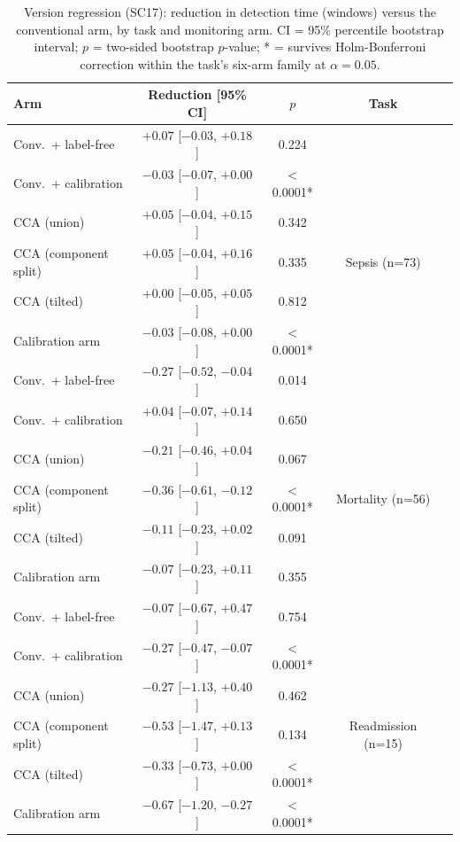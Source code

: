 \documentclass[apajournal,article,submit,oneauthor]{Definitions/mdpi}
\begin{document}
\begin{table}[H]
\caption{Version regression (SC17): reduction in detection time (windows) versus the conventional arm, by task and monitoring arm. CI = 95\% percentile bootstrap interval; $p$ = two-sided bootstrap $p$-value; * = survives Holm-Bonferroni correction within the task's six-arm family at $\alpha=0.05$.\label{tab:sc17}}
\begin{tabularx}{\textwidth}{lCCCC}
\toprule
\textbf{Arm} & \textbf{Reduction [95\% CI]} & \textbf{$p$} & \textbf{Task} & \\
\midrule
Conv.\ + label-free    & $+0.07$ [$-0.03$, $+0.18$]  & 0.224 &   & \\
Conv.\ + calibration   & $-0.03$ [$-0.07$, $+0.00$]  & $<$0.0001* &  & \\
CCA (union)            & $+0.05$ [$-0.04$, $+0.15$]  & 0.342 &  & \\
CCA (component split)  & $+0.05$ [$-0.04$, $+0.16$]  & 0.335 & Sepsis (n=73) & \\
CCA (tilted)            & $+0.00$ [$-0.05$, $+0.05$]  & 0.812 &  & \\
Calibration arm        & $-0.03$ [$-0.08$, $+0.00$]  & $<$0.0001* &  & \\
\midrule
Conv.\ + label-free    & $-0.27$ [$-0.52$, $-0.04$]  & 0.014 &   & \\
Conv.\ + calibration   & $+0.04$ [$-0.07$, $+0.14$]  & 0.650 &  & \\
CCA (union)            & $-0.21$ [$-0.46$, $+0.04$]  & 0.067 &  & \\
CCA (component split)  & $-0.36$ [$-0.61$, $-0.12$]  & $<$0.0001* & Mortality (n=56) & \\
CCA (tilted)            & $-0.11$ [$-0.23$, $+0.02$]  & 0.091 &  & \\
Calibration arm        & $-0.07$ [$-0.23$, $+0.11$]  & 0.355 &  & \\
\midrule
Conv.\ + label-free    & $-0.07$ [$-0.67$, $+0.47$]  & 0.754 &   & \\
Conv.\ + calibration   & $-0.27$ [$-0.47$, $-0.07$]  & $<$0.0001* &  & \\
CCA (union)            & $-0.27$ [$-1.13$, $+0.40$]  & 0.462 &  & \\
CCA (component split)  & $-0.53$ [$-1.47$, $+0.13$]  & 0.134 & Readmission (n=15) & \\
CCA (tilted)            & $-0.33$ [$-0.73$, $+0.00$]  & $<$0.0001* &  & \\
Calibration arm        & $-0.67$ [$-1.20$, $-0.27$]  & $<$0.0001* &  & \\
\bottomrule
\end{tabularx}
\end{table}
\end{document}
